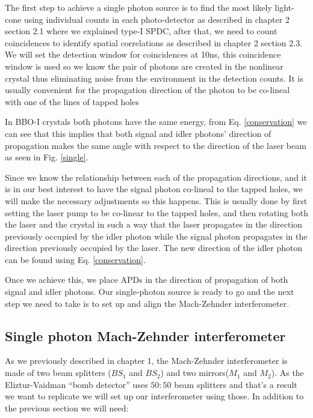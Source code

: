 \documentclass[12pt]{article}
\begin{document}
The first step to achieve a single photon source is to find the most likely light-cone using individual counts in each photo-detector as described in chapter 2 section 2.1 where we explained type-I SPDC, after that, we need to count coincidences to identify spatial correlations as described in chapter 2 section 2.3. We will set the detection window for coincidences at 10ns, this coincidence window is used so we know the pair of photons are created in the nonlinear crystal thus eliminating noise from the environment in the detection counts. It is usually convenient for the propagation direction of the photon to be co-lineal with one of the lines of tapped holes

In BBO-I crystals both photons have the same energy, from Eq. \ref{conservation} we can see that this implies that both signal and idler photons' direction of propagation makes the same angle with respect to the direction of the laser beam as seen in Fig. \ref{single}.

Since we know the relationship between each of the propagation directions, and it is in our best interest to have the signal photon co-lineal to the tapped holes, we will make the necessary adjustments so this happens. This is usually done by first setting the laser pump to be co-linear to the tapped holes, and then rotating both the laser and the crystal in such a way that the laser propagates in the direction previously occupied by the idler photon while the signal photon propagates in the direction previously occupied by the laser. The new direction of the idler photon can be found using Eq. \ref{conservation}.

Once we achieve this, we place APDs in the direction of propagation of both signal and idler photons. Our single-photon source is ready to go and the next step we need to take is to set up and align the Mach-Zehnder interferometer.

\subsection{Single photon Mach-Zehnder interferometer}

As we previously described in chapter 1, the Mach-Zehnder interferometer is made of two beam splitters ($BS_{1}$ and $BS_{2}$) and two mirrors($M_{1}$ and $M_{2}$). As the Eliztur-Vaidman ``bomb detector'' uses $50:50$ beam splitters and that's a result we want to replicate we will set up our interferometer using those. In addition to the previous section we will need:
\end{document}
